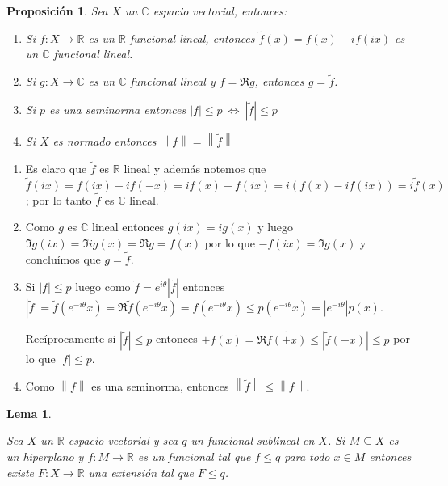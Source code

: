 \documentclass[11pt]{article}
\newcommand{\C}{\mathbb{C}}
\newcommand{\R}{{\mathbb{R}}}
\newcommand{\norm}[1]{\left\lVert#1\right\rVert}
\newcommand{\abs}[1]{\left\lvert#1\right\rvert}
\numberwithin{theorem}{subsection}
\newtheorem{lemma}[theorem]{Lema}
\newtheorem{proposition}[theorem]{Proposici\'on}
\newenvironment{proof}[1][Demostraci\'on]{\begin{trivlist}
		\item[\hskip \labelsep {\bfseries #1}]}{\end{trivlist}}
\newcommand{\qed}{\nobreak \ifvmode \relax \else
	\ifdim\lastskip<1.5em \hskip-\lastskip
	\hskip1.5em plus0em minus0.5em \fi \nobreak
	\vrule height0.75em width0.5em depth0.25em\fi}
\begin{document}
\begin{proposition}
	\label{Escritura de funcionales lineales complejos}
	Sea $X$ un $\C$ espacio vectorial, entonces:
	
	\begin{enumerate}
		\item Si $f : X \rightarrow \R$ es un $\R$ funcional lineal, entonces $\tilde{f}(x) = f(x) - if(ix)$ es un $\C$ funcional lineal.
		\item Si $g : X \rightarrow \C$ es un $\C$ funcional lineal y  $f = \Re g$, entonces $g = \tilde{f}$.
		\item Si $p$ es una seminorma entonces $\abs{f} \leq p \ \Longleftrightarrow \ \abs{\tilde{f}} \leq p$
		\item Si $X$ es normado entonces $\norm{f} = \norm{\tilde{f}}$
	\end{enumerate}
	
\end{proposition}
	
\begin{proof}
	\begin{enumerate}
		\item Es claro que $\tilde{f}$ es $\R$ lineal y adem\'as notemos que $\tilde{f}(ix) = f(ix) - if(-x) = if(x) + f(ix) =i( f(x) - i f(ix)) = i \tilde{f}(x)$; por lo tanto $\tilde{f}$ es $\C$ lineal.
		\item Como $g$ es $\C$ lineal entonces $g(ix) = ig(x)$ y luego $\Im g(ix) = \Im ig(x) = \Re g = f(x)$ por lo que $-f(ix) = \Im g(x)$ y conclu\'imos que $g = \tilde{f}$.
		\item Si $\abs{f} \leq p$ luego como $\tilde{f} = e^{i\theta}\abs{\tilde{f}}$ entonces $\abs{\tilde{f}} = \tilde{f}(e^{-i\theta}x) = \Re \tilde{f}(e^{-i\theta}x) = f(e^{-i\theta}x) \leq p(e^{-i\theta}x) = \abs{e^{-i\theta}}p(x)$.
		
		Rec\'iprocamente si $\abs{\tilde{f}} \leq p$ entonces $\pm f( x)= \Re \tilde{f(\pm x)} \leq \abs{\tilde{f}(\pm x)} \leq p$ por lo que $\abs{f} \leq p$.
		
		\item Como $\norm{f}$ es una seminorma, entonces $\norm{\tilde{f}} \leq \norm{f}$. \qed
		
	\end{enumerate}
\end{proof}	

\begin{lemma}
	\label{Lemma: Hanh-Banach}
	
	Sea $X$ un $\R$ espacio vectorial y sea $q$ un funcional sublineal en $X$. Si $M \subseteq X$ es un hiperplano y $f : M \rightarrow \R$ es un funcional tal que $f \leq q$ para todo $x \in M$ entonces existe $F : X \rightarrow \R$ una extensi\'on tal que $F \leq q$.
		
\end{lemma}
\end{document}
